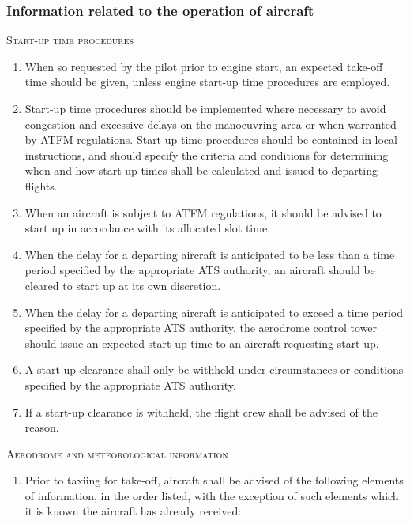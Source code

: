 \subsubsection{Information related to the operation of aircraft}

\begin{enumempty}[labelindent=\parindent]
    \item {}
\end{enumempty}

\begin{enumeratesc}
    \item \textsc{Start-up time procedures}
    \begin{enumerate}
        \item When so requested by the pilot prior to engine start, an expected take-off time should be given, unless engine start-up time procedures are employed.
        \item Start-up time procedures should be implemented where necessary to avoid congestion and excessive delays on the manoeuvring area or when warranted by ATFM regulations. Start-up time procedures should be contained in local instructions, and should specify the criteria and conditions for determining when and how start-up times shall be calculated and issued to departing flights.
        \item When an aircraft is subject to ATFM regulations, it should be advised to start up in accordance with its allocated slot time.
        \item When the delay for a departing aircraft is anticipated to be less than a time period specified by the appropriate ATS authority, an aircraft should be cleared to start up at its own discretion.
        \item When the delay for a departing aircraft is anticipated to exceed a time period specified by the appropriate ATS authority, the aerodrome control tower should issue an expected start-up time to an aircraft requesting start-up.
        \item A start-up clearance shall only be withheld under circumstances or conditions specified by the appropriate ATS authority.
        \item If a start-up clearance is withheld, the flight crew shall be advised of the reason.
    \end{enumerate}

    \item \textsc{Aerodrome and meteorological information}
    \begin{enumerate}
        \item \label{7.4.1.2.1} Prior to taxiing for take-off, aircraft shall be advised of the following elements of information, in the order listed, with the exception of such elements which it is known the aircraft has already received:
        

\end{enumerate}
\end{enumeratesc}
